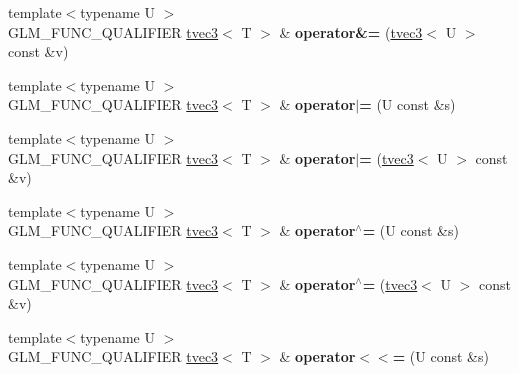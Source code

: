 \begin{DoxyCompactItemize}
\item 
\hypertarget{structglm_1_1detail_1_1tvec3_a3c8c84b97f369895891ce7a930592bd3}{{\footnotesize template$<$typename U $>$ }\\G\-L\-M\-\_\-\-F\-U\-N\-C\-\_\-\-Q\-U\-A\-L\-I\-F\-I\-E\-R \hyperlink{structglm_1_1detail_1_1tvec3}{tvec3}$<$ T $>$ \& {\bfseries operator\&=} (\hyperlink{structglm_1_1detail_1_1tvec3}{tvec3}$<$ U $>$ const \&v)}\label{structglm_1_1detail_1_1tvec3_a3c8c84b97f369895891ce7a930592bd3}

\item 
\hypertarget{structglm_1_1detail_1_1tvec3_af3105fb38aa81e4518589656191dffaa}{{\footnotesize template$<$typename U $>$ }\\G\-L\-M\-\_\-\-F\-U\-N\-C\-\_\-\-Q\-U\-A\-L\-I\-F\-I\-E\-R \hyperlink{structglm_1_1detail_1_1tvec3}{tvec3}$<$ T $>$ \& {\bfseries operator$\vert$=} (U const \&s)}\label{structglm_1_1detail_1_1tvec3_af3105fb38aa81e4518589656191dffaa}

\item 
\hypertarget{structglm_1_1detail_1_1tvec3_afc30d0dddc7b8a7dfa44a0b562382d60}{{\footnotesize template$<$typename U $>$ }\\G\-L\-M\-\_\-\-F\-U\-N\-C\-\_\-\-Q\-U\-A\-L\-I\-F\-I\-E\-R \hyperlink{structglm_1_1detail_1_1tvec3}{tvec3}$<$ T $>$ \& {\bfseries operator$\vert$=} (\hyperlink{structglm_1_1detail_1_1tvec3}{tvec3}$<$ U $>$ const \&v)}\label{structglm_1_1detail_1_1tvec3_afc30d0dddc7b8a7dfa44a0b562382d60}

\item 
\hypertarget{structglm_1_1detail_1_1tvec3_ab121deb8dde4fa69e58eae2f9dbdfe29}{{\footnotesize template$<$typename U $>$ }\\G\-L\-M\-\_\-\-F\-U\-N\-C\-\_\-\-Q\-U\-A\-L\-I\-F\-I\-E\-R \hyperlink{structglm_1_1detail_1_1tvec3}{tvec3}$<$ T $>$ \& {\bfseries operator$^\wedge$=} (U const \&s)}\label{structglm_1_1detail_1_1tvec3_ab121deb8dde4fa69e58eae2f9dbdfe29}

\item 
\hypertarget{structglm_1_1detail_1_1tvec3_ab0f2082a619f76bf3686de62d32a88b1}{{\footnotesize template$<$typename U $>$ }\\G\-L\-M\-\_\-\-F\-U\-N\-C\-\_\-\-Q\-U\-A\-L\-I\-F\-I\-E\-R \hyperlink{structglm_1_1detail_1_1tvec3}{tvec3}$<$ T $>$ \& {\bfseries operator$^\wedge$=} (\hyperlink{structglm_1_1detail_1_1tvec3}{tvec3}$<$ U $>$ const \&v)}\label{structglm_1_1detail_1_1tvec3_ab0f2082a619f76bf3686de62d32a88b1}

\item 
\hypertarget{structglm_1_1detail_1_1tvec3_af31188cf640fb1f71617a29df85ad6c6}{{\footnotesize template$<$typename U $>$ }\\G\-L\-M\-\_\-\-F\-U\-N\-C\-\_\-\-Q\-U\-A\-L\-I\-F\-I\-E\-R \hyperlink{structglm_1_1detail_1_1tvec3}{tvec3}$<$ T $>$ \& {\bfseries operator$<$$<$=} (U const \&s)}\label{structglm_1_1detail_1_1tvec3_af31188cf640fb1f71617a29df85ad6c6}


\end{DoxyCompactItemize}
